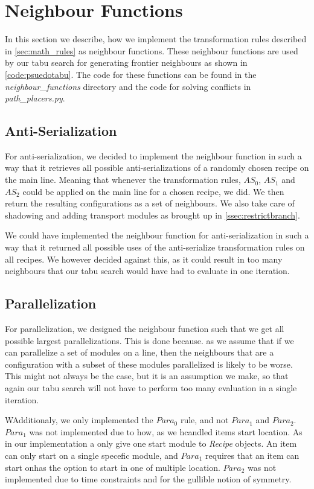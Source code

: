 \section{Neighbour Functions}
In this section we describe, how we implement the transformation rules described in \cref{sec:math_rules} as neighbour functions. These neighbour functions are used by our tabu search for generating frontier neighbours as shown in \cref{code:psuedotabu}. The code for these functions can be found in the \textit{neighbour\_functions} directory and the code for solving conflicts in \textit{path\_placers.py}.


\subsection{Anti-Serialization}
For anti-serialization, we decided to implement the neighbour function in such a way that it retrieves all possible anti-serializations of a randomly chosen recipe on the main line. Meaning that whenever the transformation rules, $AS_0$, $AS_1$ and $AS_2$ could be applied on the main line for a chosen recipe, we did. We then return the resulting configurations as a set of neighbours. We also take care of shadowing and adding transport modules as brought up in \cref{ssec:restrictbranch}.

We could have implemented the neighbour function for anti-serialization in such a way that it returned all possible uses of the anti-serialize transformation rules on all recipes. We however decided against this, as it could result in too many neighbours that our tabu search would have had to evaluate in one iteration.


\subsection{Parallelization}
For parallelization, we designed the neighbour function such that we get all possible largest parallelizations. This is done because. as we assume that if we can parallelize a set of modules on a line, then the neighbours that are a configuration with a subset of these modules parallelized is likely to be worse. This might not always be the case, but it is an assumption we make, so that again our tabu search will not have to perform too many evaluation in a single iteration. 

WAdditionaly, we only implemented the $Para_0$ rule, and not $Para_1$ and $Para_2$. $Para_1$ was not implemented due to how, as we hcandled items start location. As in our implementation a only give one start module to \textit{Recipe} objects. An item can only start on a single specefic module, and $Para_1$ requires that an item can start onhas the option to start in one of multiple location. $Para_2$ was not implemented due to time constraints and for the gullible notion of symmetry.



